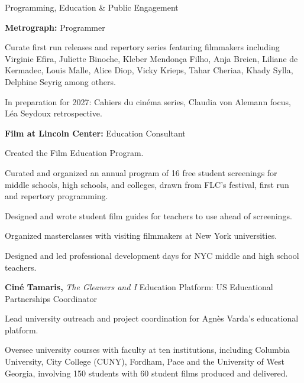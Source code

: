 \begin{rubric}{Programming, Education \& Public Engagement}

\entry*[2022--present]%
\textbf{Metrograph:} Programmer
\par
\begin{cvitems}
  \item Curate first run releases and repertory series featuring filmmakers including Virginie
  Efira, Juliette Binoche, Kleber Mendon\c{c}a Filho, Anja Breien, Liliane de Kermadec, Louis
  Malle, Alice Diop, Vicky Krieps, Tahar Cheriaa, Khady Sylla, Delphine Seyrig among others.
  \item In preparation for 2027: Cahiers du cin\'ema series, Claudia von Alemann focus, L\'ea
  Seydoux retrospective.
\end{cvitems}

\entry*[2023--2026]%
\textbf{Film at Lincoln Center:} Education Consultant
\par
\begin{cvitems}
  \item Created the Film Education Program.
  \item Curated and organized an annual program of 16 free student screenings for middle
  schools, high schools, and colleges, drawn from FLC's festival, first run and repertory
  programming.
  \item Designed and wrote student film guides for teachers to use ahead of screenings.
  \item Organized masterclasses with visiting filmmakers at New York universities.
  \item Designed and led professional development days for NYC middle and high school teachers.
\end{cvitems}

\entry*[2024--present]%
\textbf{Cin\'e Tamaris,} \textit{The Gleaners and I} Education Platform: US Educational
Partnerships Coordinator
\par
\begin{cvitems}
  \item Lead university outreach and project coordination for Agn\`es Varda's educational platform.
  \item Oversee university courses with faculty at ten institutions, including Columbia
  University, City College (CUNY), Fordham, Pace and the University of West Georgia, involving
  150 students with 60 student films produced and delivered.
\end{cvitems}


\end{rubric}

